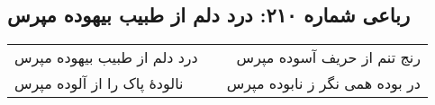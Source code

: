 \begin{center}
\section*{رباعی شماره ۲۱۰: درد دلم از طبیب بیهوده مپرس}
\label{sec:sh210}
\begin{longtable}{l p{0.5cm} r}
درد دلم از طبیب بیهوده مپرس
&&
رنج تنم از حریف آسوده مپرس
\\
نالودهٔ پاک را از آلوده مپرس
&&
در بوده همی نگر ز نابوده مپرس
\\
\end{longtable}
\end{center}
